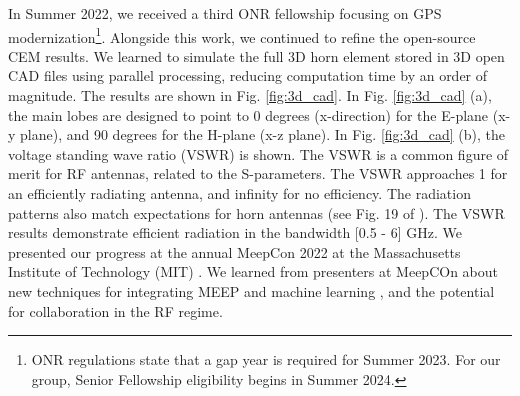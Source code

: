 \documentclass[11pt]{amsart}
\begin{document}
In Summer 2022, we received a third ONR fellowship focusing on GPS modernization\footnote{ONR regulations state that a gap year is required for Summer 2023.  For our group, Senior Fellowship eligibility begins in Summer 2024.}.  Alongside this work, we continued to refine the open-source CEM results.  We learned to simulate the full 3D horn element stored in 3D open CAD files using parallel processing, reducing computation time by an order of magnitude.  The results are shown in Fig. \ref{fig:3d_cad}.  In Fig. \ref{fig:3d_cad} (a), the main lobes are designed to point to 0 degrees (x-direction) for the E-plane (x-y plane), and 90 degrees for the H-plane (x-z plane).  In Fig. \ref{fig:3d_cad} (b), the voltage standing wave ratio (VSWR) is shown.  The VSWR is a common figure of merit for RF antennas, related to the S-parameters.  The VSWR approaches 1 for an efficiently radiating antenna, and infinity for no efficiency.  The radiation patterns also match expectations for horn antennas (see Fig. 19 of \cite{8786183}).  The VSWR results demonstrate efficient radiation in the bandwidth [0.5 - 6] GHz.  We presented our progress at the annual MeepCon 2022 at the Massachusetts Institute of Technology (MIT) \cite{meepcon2022}.  We learned from presenters at MeepCOn about new techniques for integrating MEEP and machine learning \cite{meepcon2022_2}, and the potential for collaboration in the RF regime.
\end{document}
